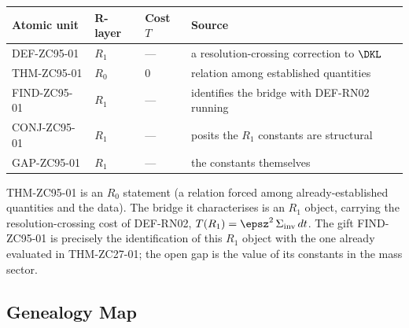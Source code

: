 \documentclass[12pt, a4paper]{article}
\begin{document}
\begin{layerbox}[title={R-Layer Assignments for ZC95}]
{\small\renewcommand{\arraystretch}{1.25}
\begin{center}
\begin{tabular}{@{}llll@{}}
\toprule
Atomic unit & R-layer & Cost $T$ & Source \\
\midrule
DEF-ZC95-01  & $R_1$ & --- & a resolution-crossing correction to $\DKL$ \\
THM-ZC95-01  & $R_0$ & $0$ & relation among established quantities \\
FIND-ZC95-01 & $R_1$ & --- & identifies the bridge with DEF-RN02 running \\
CONJ-ZC95-01 & $R_1$ & --- & posits the $R_1$ constants are structural \\
GAP-ZC95-01  & $R_1$ & --- & the constants themselves \\
\bottomrule
\end{tabular}
\end{center}}
THM-ZC95-01 is an $R_0$ statement (a relation forced among already-established
quantities and the data). The bridge it characterises is an $R_1$ object,
carrying the resolution-crossing cost of DEF-RN02, $T(R_1)=\epsz^2\,
\Sigma_{\mathrm{inv}}\,dt$. The gift FIND-ZC95-01 is precisely the
identification of this $R_1$ object with the one already evaluated in
THM-ZC27-01; the open gap is the value of its constants in the mass sector.
\end{layerbox}

\subsection{Genealogy Map}
\label{sec:genealogy-zc95}
\end{document}
